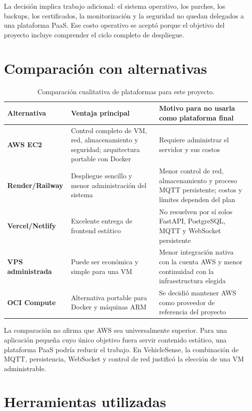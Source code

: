 \documentclass[12pt,a4paper,oneside]{report}
\begin{document}
La decisión implica trabajo adicional: el sistema operativo, los parches, los
backups, los certificados, la monitorización y la seguridad no quedan delegados a
una plataforma PaaS. Ese costo operativo se aceptó porque el objetivo del proyecto
incluye comprender el ciclo completo de despliegue.

\section{Comparación con alternativas}

\begin{table}[ht]
\centering
\small
\begin{tabularx}{\textwidth}{>{\bfseries}l X X}
\toprule
Alternativa & Ventaja principal & Motivo para no usarla como plataforma final \\
\midrule
AWS EC2 & Control completo de VM, red, almacenamiento y seguridad; arquitectura
  portable con Docker & Requiere administrar el servidor y sus costos \\
Render/Railway & Despliegue sencillo y menor administración del sistema & Menor
  control de red, almacenamiento y proceso MQTT persistente; costos y límites
  dependen del plan \\
Vercel/Netlify & Excelente entrega de frontend estático & No resuelven por sí solos
  FastAPI, PostgreSQL, MQTT y WebSocket persistente \\
VPS administrada & Puede ser económica y simple para una VM & Menor integración
  nativa con la cuenta AWS y menor continuidad con la infraestructura elegida \\
OCI Compute & Alternativa portable para Docker y máquinas ARM & Se decidió
  mantener AWS como proveedor de referencia del proyecto \\
\bottomrule
\end{tabularx}
\caption{Comparación cualitativa de plataformas para este proyecto.}
\end{table}

La comparación no afirma que AWS sea universalmente superior. Para una aplicación
pequeña cuyo único objetivo fuera servir contenido estático, una plataforma PaaS
podría reducir el trabajo. En VehicleSense, la combinación de MQTT, persistencia,
WebSocket y control de red justificó la elección de una VM administrable.

\section{Herramientas utilizadas}
\end{document}
